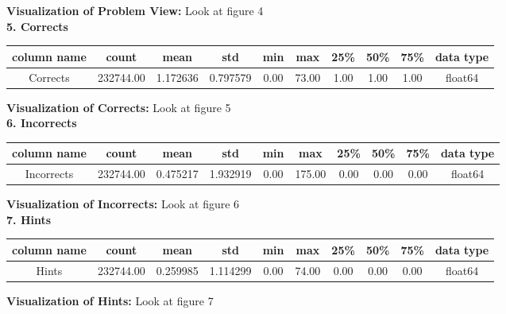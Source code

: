 \documentclass{article}
\begin{document}
\textbf{Visualization of Problem View:} Look at figure 4\\
\textbf{5. Corrects} \\
\begin{tabular}{|c|c|c|c|c|c|c|c|c|c|}
  \hline
  column name & count     & mean     & std      & min  & max   & 25\% & 50\% & 75\% & data type \\
  \hline
  Corrects    & 232744.00 & 1.172636 & 0.797579 & 0.00 & 73.00 & 1.00 & 1.00 & 1.00 & float64   \\
  \hline
\end{tabular}

\textbf{Visualization of Corrects:} Look at figure 5\\
\textbf{6. Incorrects} \\
\begin{tabular}{|c|c|c|c|c|c|c|c|c|c|}
  \hline
  column name & count     & mean     & std      & min  & max    & 25\% & 50\% & 75\% & data type \\
  \hline
  Incorrects  & 232744.00 & 0.475217 & 1.932919 & 0.00 & 175.00 & 0.00 & 0.00 & 0.00 & float64   \\
  \hline
\end{tabular}

\textbf{Visualization of Incorrects:} Look at figure 6\\
\textbf{7. Hints} \\
\begin{tabular}{|c|c|c|c|c|c|c|c|c|c|}
  \hline
  column name & count     & mean     & std      & min  & max   & 25\% & 50\% & 75\% & data type \\
  \hline
  Hints       & 232744.00 & 0.259985 & 1.114299 & 0.00 & 74.00 & 0.00 & 0.00 & 0.00 & float64   \\
  \hline
\end{tabular}

\textbf{Visualization of Hints:} Look at figure 7\\
\end{document}
